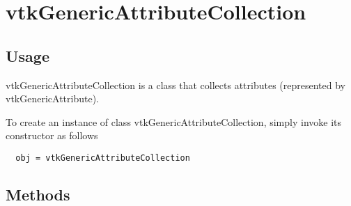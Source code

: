 \section{vtkGenericAttributeCollection}

\subsection{Usage}

 vtkGenericAttributeCollection is a class that collects attributes 
 (represented by vtkGenericAttribute).

To create an instance of class vtkGenericAttributeCollection, simply
invoke its constructor as follows
\begin{verbatim}
  obj = vtkGenericAttributeCollection
\end{verbatim}
\subsection{Methods}

